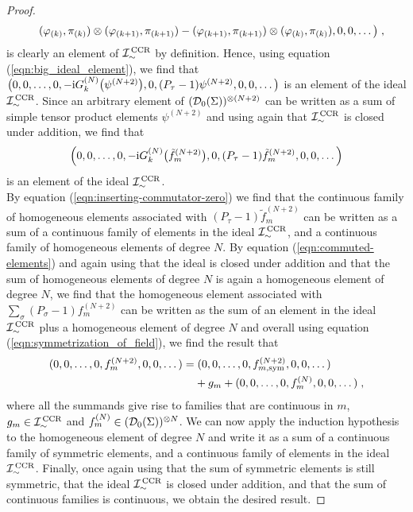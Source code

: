 \begin{proof}
\begin{align}
&\quad\quad (\varphi_{(k)},\pi_{(k)}) \otimes  (\varphi_{(k+1)},\pi_{(k+1)}) - (\varphi_{(k+1)},\pi_{(k+1)}) \otimes (\varphi_{(k)},\pi_{(k)}),0,0,\dots   \big)  \;,
\end{align}
is clearly an element of ${\mathcal{I}}_{\sim}^\text{\,CCR}$ by definition. Hence, using equation (\ref{eqn:big_ideal_element}), we find that $\big(0,0,\dots,0,-\text{\upshape{i}}  G^{(N)}_k\big( \psi^{(N+2)}\big)  , 0, (P_\tau - 1)\psi^{(N+2)} ,0,0,\dots\big)$ is an element of the ideal ${\mathcal{I}}_{\sim}^\text{\,CCR}$. Since an arbitrary element of $(\mathcal{D}_{0}(\Sigma))^{\otimes(N+2)}$ can be written as a sum of simple tensor product elements $\psi^{(N+2)}$ and using again that ${\mathcal{I}}_{\sim}^\text{\,CCR}$ is closed under addition, we find that
\begin{align}
\left(0,0,\dots,0,-\text{\upshape{i}} G^{(N)}_k\big( \tilde{f}_m^{(N+2)}\big)  , 0, (P_\tau - 1) \tilde{f}_m^{(N+2)} ,0,0,\dots\right)
\end{align}
is an element of the ideal ${\mathcal{I}}_{\sim}^\text{\,CCR}$. \\
By equation (\ref{eqn:inserting-commutator-zero}) we find that the continuous family of homogeneous elements associated with $(P_\tau -1) \tilde{f}_m^{(N+2)}$ can be written as a sum of a continuous family of elements in the ideal ${\mathcal{I}}_{\sim}^\text{\,CCR}$, and a continuous family of homogeneous elements of degree $N$. By equation (\ref{eqn:commuted-elements}) and again using that the ideal is closed under addition and that the sum of homogeneous elements of degree $N$ is again a homogeneous element of degree $N$, we find that the homogeneous element associated with $\sum_{\sigma} (P_\sigma -1) f^{(N+2)}_m$ can be written as the sum of an element in the ideal ${\mathcal{I}}_{\sim}^\text{\,CCR}$ plus a homogeneous element of degree $N$ and overall using equation (\ref{eqn:symmetrization_of_field}), we find the result that
\begin{align}
	(0,0,\dots,0,f_m^{(N+2)},0,0,\dots) &= (0,0,\dots,0,f_{m,\text{sym}}^{(N+2)},0,0,\dots) \notag \\
																&\phantom{M}+ g_m + (0,0,\dots,0,f_m^{(N)},0,0,\dots) \;,
\end{align}
where all the summands give rise to families that are continuous in $m$, $g_m \in {\mathcal{I}}_{\sim}^\text{\,CCR}$ and $f_m^{(N)} \in (\mathcal{D}_{0}(\Sigma))^{\otimes N}$. We can now apply the induction hypothesis to the homogeneous element of degree $N$ and write it as a sum of a continuous family of symmetric elements, and a continuous family of elements in the ideal ${\mathcal{I}}_{\sim}^\text{\,CCR}$. Finally, once again using that the sum of symmetric elements is still symmetric, that the ideal ${\mathcal{I}}_{\sim}^\text{\,CCR}$ is closed under addition, and that the sum of continuous families is continuous, we obtain the desired result.
\end{proof}
